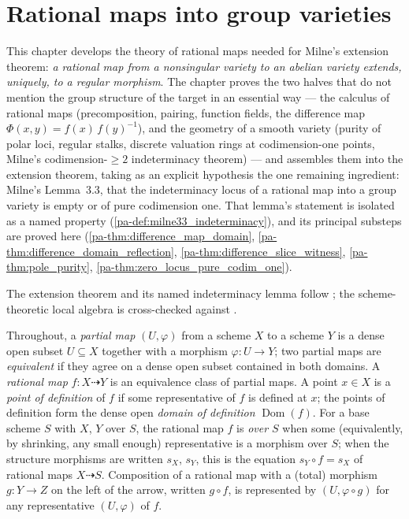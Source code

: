 \section{Rational maps into group varieties}
\label{pa-chap:Albanese}

This chapter develops the theory of rational maps needed for Milne's extension
theorem: \emph{a rational map from a nonsingular variety to an abelian variety
extends, uniquely, to a regular morphism}. The chapter proves the two halves that
do not mention the group structure of the target in an essential way --- the
calculus of rational maps (precomposition, pairing, function fields, the
difference map \(\Phi(x,y) = f(x)\,f(y)^{-1}\)), and the geometry of a smooth
variety (purity of polar loci, regular stalks, discrete valuation rings at
codimension-one points, Milne's codimension-\(\geq 2\) indeterminacy theorem) ---
and assembles them into the extension theorem, taking as an explicit hypothesis
the one remaining ingredient: Milne's Lemma~3.3, that the indeterminacy locus of
a rational map into a group variety is empty or of pure codimension one. That
lemma's statement is isolated as a named property
(\ref{pa-def:milne33_indeterminacy}), and its principal substeps are proved here
(\ref{pa-thm:difference_map_domain}, \ref{pa-thm:difference_domain_reflection},
\ref{pa-thm:difference_slice_witness}, \ref{pa-thm:pole_purity},
\ref{pa-thm:zero_locus_pure_codim_one}).

The extension theorem and its named indeterminacy lemma follow \cite{milne-av}; the
scheme-theoretic local algebra is cross-checked against \cite{stacks-project}.

Throughout, a \emph{partial map} \((U, \varphi)\) from a scheme \(X\) to a scheme
\(Y\) is a dense open subset \(U \subseteq X\) together with a morphism
\(\varphi : U \to Y\); two partial maps are \emph{equivalent} if they agree on a
dense open subset contained in both domains. A \emph{rational map}
\(f : X \dashrightarrow Y\) is an equivalence class of partial maps. A point
\(x \in X\) is a \emph{point of definition} of \(f\) if some representative of
\(f\) is defined at \(x\); the points of definition form the dense open
\emph{domain of definition} \(\operatorname{Dom}(f)\). For a base scheme \(S\)
with \(X\), \(Y\) over \(S\), the rational map \(f\) is \emph{over \(S\)} when
some (equivalently, by shrinking, any small enough) representative is a morphism
over \(S\); when the structure morphisms are written \(s_X\), \(s_Y\), this is
the equation \(s_Y \circ f = s_X\) of rational maps \(X \dashrightarrow S\).
Composition of a rational map with a (total) morphism \(g : Y \to Z\) on the
left of the arrow, written \(g \circ f\), is represented by \((U, \varphi
\circ g)\) for any representative \((U, \varphi)\) of \(f\).

